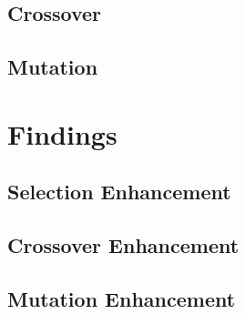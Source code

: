 \documentclass[a4paper, twocolumn]{article}
\begin{document}
\subsection{Crossover\label{sec:Crossover}}
\subsection{Mutation\label{sec:Mutation}}

\section{Findings\label{sec:Findings}}
\subsection{Selection Enhancement\label{sec:Selection Enhancement}}
\subsection{Crossover Enhancement\label{sec:Crossover Enhancement}}
\subsection{Mutation Enhancement\label{sec:Mutation Enhancement}}
\printbibliography
\end{document}
